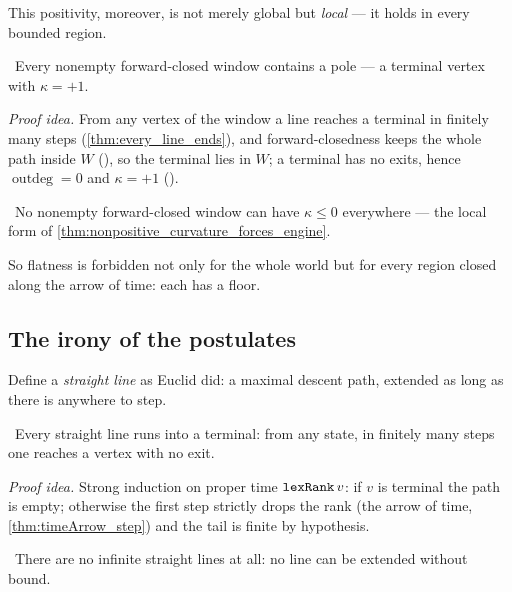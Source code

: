 This positivity, moreover, is not merely global but \emph{local} --- it holds in every bounded region.

\begin{theorem}\label{thm:forwardClosed_has_pole}
\green{}\ Every nonempty forward-closed window contains a pole --- a terminal vertex with $\kappa = +1$.
\end{theorem}

\emph{Proof idea.} From any vertex of the window a line reaches a terminal in finitely many steps
(\cref{thm:every_line_ends}), and forward-closedness keeps the whole path inside $W$
(), so the terminal lies in $W$; a terminal has no exits, hence
$\operatorname{outdeg} = 0$ and $\kappa = +1$ ().

\begin{theorem}\label{thm:forwardClosed_not_flat}
\green{}\ No nonempty forward-closed window can have $\kappa \le 0$ everywhere --- the local form of
\cref{thm:nonpositive_curvature_forces_engine}. 
\end{theorem}

So flatness is forbidden not only for the whole world but for every region closed along the arrow of
time: each has a floor.

\subsection{The irony of the postulates}

Define a \emph{straight line} as Euclid did: a maximal descent path, extended as long as there is
anywhere to step.

\begin{theorem}\label{thm:every_line_ends}
\green{}\ Every straight line runs into a terminal: from any state, in finitely many steps one reaches
a vertex with no exit. 
\end{theorem}

\emph{Proof idea.} Strong induction on proper time $\texttt{lexRank}\,v$: if $v$ is terminal the path
is empty; otherwise the first step strictly drops the rank (the arrow of time,
\cref{thm:timeArrow_step}) and the tail is finite by hypothesis.

\begin{theorem}\label{thm:no_infinite_line}
\green{}\ There are no infinite straight lines at all: no line can be extended without bound.
\end{theorem}

